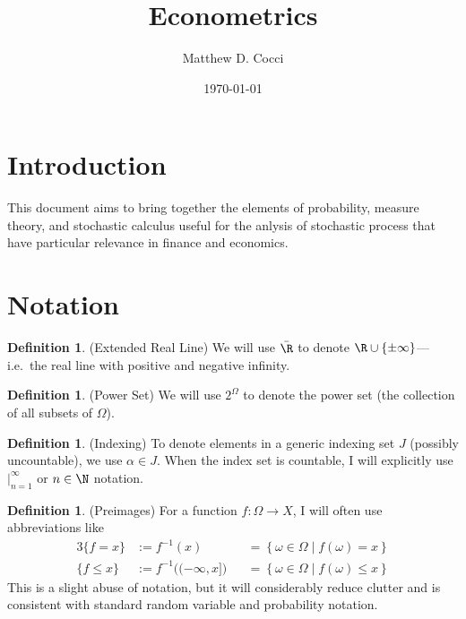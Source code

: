\documentclass[12pt]{article}
\author{Matthew D. Cocci}
\title{Econometrics}
\date{\today}
\theoremstyle{plain}
\theoremstyle{definition}
\newtheorem{defn}[thm]{Definition}
\theoremstyle{remark}
\newcommand{\ra}{\rightarrow}
\begin{document}
\maketitle
\tableofcontents %

\clearpage

\section{Introduction}

This document aims to bring together the elements of probability,
measure theory, and stochastic calculus useful for the anlysis of
stochastic process that have particular relevance in finance and
economics.


\section{Notation}


\begin{defn}(Extended Real Line)
We will use $\bar{\R}$ to denote $\R \cup \{\pm \infty\}$---i.e.\ the
real line with positive and negative infinity.
\end{defn}

\begin{defn}(Power Set)
We will use $2^\Omega$ to denote the power set (the collection of all
subsets of $\Omega$).
\end{defn}

\begin{defn}(Indexing)
To denote elements in a generic indexing set $J$ (possibly uncountable),
we use $\alpha \in J$. When the index set is countable, I will
explicitly use $|_{n=1}^\infty$ or $n\in\N$ notation.
\end{defn}

\begin{defn}(Preimages)
For a function $f:\Omega\ra X$, I will often use abbreviations like
\begin{alignat*}{3}
  \{f=x\} &:= f^{-1}(x)
  &&= \left\{ \omega\in\Omega \;|\; f(\omega)= x\right\} \\
  \{f \leq x\} &:= f^{-1}\big((-\infty,x]\big)
  &&= \left\{ \omega\in\Omega \;|\; f(\omega)\leq x \right\}
\end{alignat*}
This is a slight abuse of notation, but it will considerably reduce
clutter and is consistent with standard random variable and probability
notation.
\end{defn}
\end{document}
